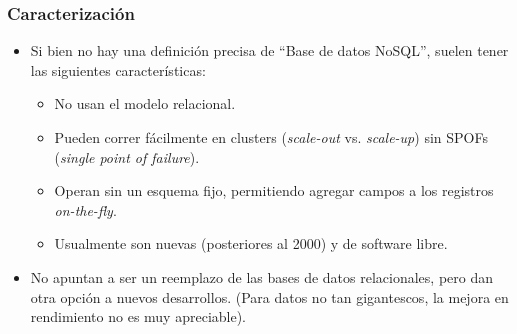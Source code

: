 \begin{frame}
\frametitle{Caracterización}
\begin{itemize}

\item	Si bien no hay una definición precisa de ``Base de datos
	NoSQL'', suelen tener las siguientes características:
	\pause
	\begin{itemize}
	\item	No usan el modelo relacional.
		\pause

	\item	Pueden correr fácilmente en clusters (\textit{scale-out}
		vs. \textit{scale-up}) sin SPOFs (\textit{single point of
		failure}).
		\pause

	\item	Operan sin un esquema fijo, permitiendo agregar campos
		a los registros \textit{on-the-fly}.
		\pause

	\item	Usualmente son nuevas (posteriores al 2000) y de software
		libre.
	\end{itemize}
	\pause

\item	No apuntan a ser un reemplazo de las bases de datos relacionales,
	pero dan otra opción a nuevos desarrollos. (Para datos no tan
	gigantescos, la mejora en rendimiento no es muy apreciable).
\end{itemize}
\end{frame}
